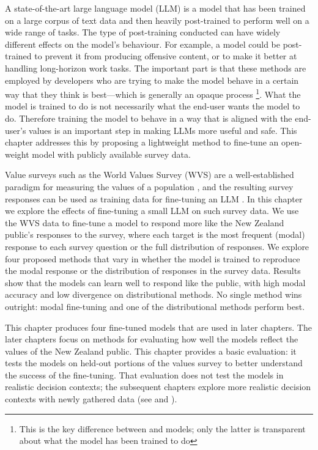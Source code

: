 A state-of-the-art large language model (LLM) is a model that has been trained on a large corpus of text data and then heavily post-trained to perform well on a wide range of tasks. The type of post-training conducted can have widely different effects on the model's behaviour. For example, a model could be post-trained to prevent it from producing offensive content, or to make it better at handling long-horizon work tasks. The important part is that these methods are employed by developers who are trying to make the model behave in a certain way that they think is best—which is generally an opaque process \footnote{This is the key difference between  and  models; only the latter is transparent about what the model has been trained to do}. What the model is trained to do is not necessarily what the end-user wants the model to do. Therefore training the model to behave in a way that is aligned with the end-user's values is an important step in making LLMs more useful and safe. This chapter addresses this by proposing a lightweight method to fine-tune an open-weight model with publicly available survey data.

Value surveys such as the World Values Survey (WVS) are a well-established paradigm for measuring the values of a population \cite{WVS2020}, and the resulting survey responses can be used as training data for fine-tuning an LLM \cite{nieSurveytoBehaviorDownstreamAlignment2025}. In this chapter we explore the effects of fine-tuning a small LLM on such survey data. We use the WVS data to fine-tune a model to respond more like the New Zealand public's responses to the survey, where each target is the most frequent (modal) response to each survey question or the full distribution of responses. We explore four proposed methods that vary in whether the model is trained to reproduce the modal response or the distribution of responses in the survey data. Results show that the models can learn well to respond like the public, with high modal accuracy and low divergence on distributional methods. No single method wins outright: modal fine-tuning and one of the distributional methods perform best.

This chapter produces four fine-tuned models that are used in later chapters. The later chapters focus on methods for evaluating how well the models reflect the values of the New Zealand public. This chapter provides a basic evaluation: it tests the models on held-out portions of the values survey to better understand the success of the fine-tuning. That evaluation does not test the models in realistic decision contexts; the subsequent chapters explore more realistic decision contexts with newly gathered data (see  and ).

